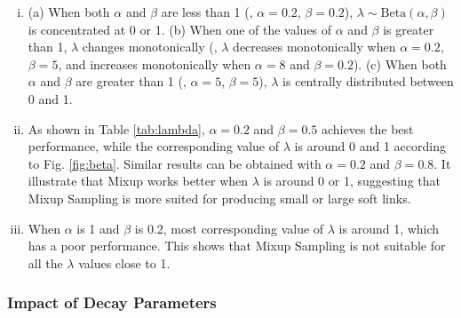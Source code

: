 \begin{enumerate}[i.]
    \item (a) When both \(\alpha\) and \(\beta\) are less than 1 (\eg, $\alpha=0.2$, $\beta=0.2$), $\lambda \sim \text{Beta}(\alpha, \beta)$ is concentrated at 0 or 1. (b) When one of the values of \(\alpha\) and \(\beta\)  is greater than 1, \(\lambda\) changes monotonically (\eg, \(\lambda\) decreases monotonically when $\alpha=0.2$, $\beta=5$, and increases monotonically when $\alpha=8$ and $\beta=0.2$). (c) When both \(\alpha\) and \(\beta\)  are greater than 1 (\eg, $\alpha=5$, $\beta=5$), \(\lambda\) is centrally distributed between 0 and 1.
    
    \item As shown in Table \ref{tab:lambda}, $\alpha = 0.2$ and $\beta= 0.5$ achieves the best performance, while the corresponding value of $\lambda$ is around 0 and 1 according to Fig. \ref{fig:beta}. Similar results can be obtained with $\alpha = 0.2$ and $\beta= 0.8$. It illustrate that Mixup works better when $\lambda$ is around 0 or 1, suggesting that Mixup Sampling is more suited for producing small or large soft links.
    \item When $\alpha$ is 1 and $\beta$ is 0.2, most corresponding value of $\lambda$ is around 1, which has a poor performance.  This shows that Mixup Sampling is not suitable for all the $\lambda$ values close to 1.
\end{enumerate}





\subsubsection{\textbf{Impact of Decay Parameters}}

